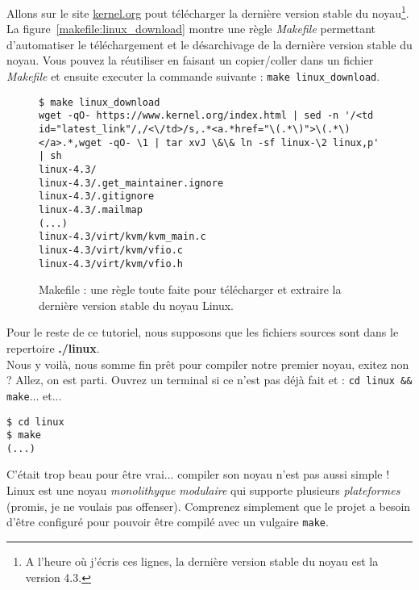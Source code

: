 \documentclass[a4paper]{article}
\begin{document}
Allons sur le site \href{http://www.kernel.org}{kernel.org} pout télécharger la dernière version stable du noyau\footnote{A l'heure où j'écris ces lignes, la dernière version stable du noyau est la version 4.3.}. La figure~\ref{makefile:linux_download} montre une règle \textit{Makefile} permettant d'automatiser le téléchargement et le désarchivage de la dernière version stable du noyau. Vous pouvez la réutiliser en faisant un copier/coller dans un fichier \textit{Makefile} et ensuite executer la commande suivante : \lstset{language=sh}\lstinline{make linux_download}.\\

\begin{figure}
\label{make:linux_download}
\begin{verbatim}
$ make linux_download 
wget -qO- https://www.kernel.org/index.html | sed -n '/<td id="latest_link"/,/<\/td>/s,.*<a.*href="\(.*\)">\(.*\)</a>.*,wget -qO- \1 | tar xvJ \&\& ln -sf linux-\2 linux,p' | sh
linux-4.3/
linux-4.3/.get_maintainer.ignore
linux-4.3/.gitignore
linux-4.3/.mailmap
(...)
linux-4.3/virt/kvm/kvm_main.c
linux-4.3/virt/kvm/vfio.c
linux-4.3/virt/kvm/vfio.h
\end{verbatim}
\caption{Makefile : une règle toute faite pour télécharger et extraire la dernière version stable du noyau Linux.}
\end{figure}

Pour le reste de ce tutoriel, nous supposons que les fichiers sources sont dans le repertoire \textbf{./linux}.\\

Nous y voilà, nous somme fin prêt pour compiler notre premier noyau, exitez non ? Allez, on est parti. Ouvrez un terminal si ce n'est pas déjà fait et : \lstset{language=sh}\lstinline{cd linux && make}... et...

\begin{verbatim}
$ cd linux
$ make
(...)
\end{verbatim}

C'était trop beau pour être vrai... compiler son noyau n'est pas aussi simple ! Linux est une noyau \textit{monolithyque} \textit{modulaire} qui supporte plusieurs \textit{plateformes} (promis, je ne voulais pas offenser). Comprenez simplement que le projet a besoin d'être configuré pour pouvoir être compilé avec un vulgaire \lstset{language=sh}\lstinline{make}.\\
\end{document}
